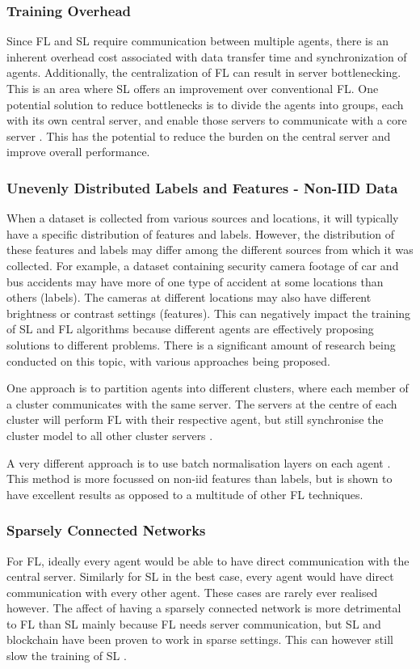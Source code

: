 \subsubsection{Training Overhead}
Since FL and SL require communication between multiple agents, there is an inherent overhead cost associated with data transfer time and synchronization of agents. Additionally, the centralization of FL can result in server bottlenecking. This is an area where SL offers an improvement over conventional FL. One potential solution to reduce bottlenecks is to divide the agents into groups, each with its own central server, and enable those servers to communicate with a core server \cite{multi_center_fed_learning}. This has the potential to reduce the burden on the central server and improve overall performance.

\subsubsection{Unevenly Distributed Labels and Features - Non-IID Data}
When a dataset is collected from various sources and locations, it will typically have a specific distribution of features and labels. However, the distribution of these features and labels may differ among the different sources from which it was collected. For example, a dataset containing security camera footage of car and bus accidents may have more of one type of accident at some locations than others (labels). The cameras at different locations may also have different brightness or contrast settings (features). This can negatively impact the training of SL and FL algorithms \citeme because different agents are effectively proposing solutions to different problems. There is a significant amount of research being conducted on this topic, with various approaches being proposed.

One approach is to partition agents into different clusters, where each member of a cluster communicates with the same server. The servers at the centre of each cluster will perform FL with their respective agent, but still synchronise the cluster model to all other cluster servers \cite{multi_center_fed_learning}.

A very different approach is to use batch normalisation layers on each agent \cite{fedbn}. This method is more focussed on non-iid features than labels, but is shown to have excellent results as opposed to a multitude of other FL techniques.

\subsubsection{Sparsely Connected Networks}
For FL, ideally every agent would be able to have direct communication with the central server. Similarly for SL in the best case, every agent would have direct communication with every other agent. These cases are rarely ever realised however. The affect of having a sparsely connected network is more detrimental to FL than SL mainly because FL needs server communication, but SL and blockchain have been proven to work in sparse settings. This can however still slow the training of SL \citeme.

